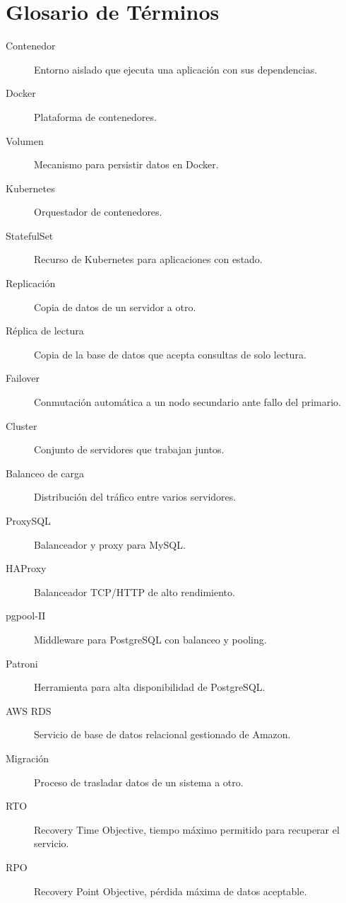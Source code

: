 \documentclass[12pt,a4paper,openany,oneside]{book}
\begin{document}
\chapter{Glosario de Términos}
\begin{description}
    \item[Contenedor] Entorno aislado que ejecuta una aplicación con sus dependencias.
    \item[Docker] Plataforma de contenedores.
    \item[Volumen] Mecanismo para persistir datos en Docker.
    \item[Kubernetes] Orquestador de contenedores.
    \item[StatefulSet] Recurso de Kubernetes para aplicaciones con estado.
    \item[Replicación] Copia de datos de un servidor a otro.
    \item[Réplica de lectura] Copia de la base de datos que acepta consultas de solo lectura.
    \item[Failover] Conmutación automática a un nodo secundario ante fallo del primario.
    \item[Cluster] Conjunto de servidores que trabajan juntos.
    \item[Balanceo de carga] Distribución del tráfico entre varios servidores.
    \item[ProxySQL] Balanceador y proxy para MySQL.
    \item[HAProxy] Balanceador TCP/HTTP de alto rendimiento.
    \item[pgpool-II] Middleware para PostgreSQL con balanceo y pooling.
    \item[Patroni] Herramienta para alta disponibilidad de PostgreSQL.
    \item[AWS RDS] Servicio de base de datos relacional gestionado de Amazon.
    \item[Migración] Proceso de trasladar datos de un sistema a otro.
    \item[RTO] Recovery Time Objective, tiempo máximo permitido para recuperar el servicio.
    \item[RPO] Recovery Point Objective, pérdida máxima de datos aceptable.
\end{description}
\end{document}
